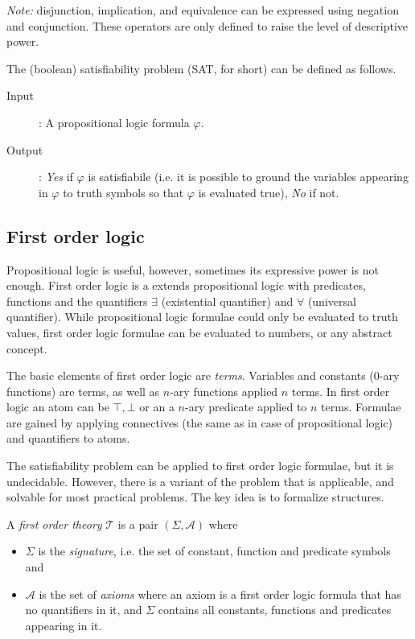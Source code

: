\emph{Note:} disjunction, implication, and equivalence can be expressed using negation and conjunction. These operators are only defined to raise the level of descriptive power.

The (boolean) satisfiability problem (SAT, for short) can be defined as follows.
\begin{description}
	\item[Input]: A propositional logic formula $\varphi$.
	\item[Output]: \emph{Yes} if $\varphi$ is satisfiabile (i.e. it is possible to ground the variables appearing in $\varphi$ to truth symbols so that $\varphi$ is evaluated true), \emph{No} if not.
\end{description}

\subsection{First order logic}

Propositional logic is useful, however, sometimes its expressive power is not enough. First order logic is a extends propositional logic with predicates, functions and the quantifiers $\exists$ (existential quantifier) and $\forall$ (universal quantifier). While propositional logic formulae could only be evaluated to truth values, first order logic formulae can be evaluated to numbers, or any abstract concept.

The basic elements of first order logic are \emph{terms}. Variables and constants (0-ary functions) are terms, as well as $n$-ary functions applied $n$ terms. In first order logic an atom can be $\top, \bot$ or an a $n$-ary predicate applied to $n$ terms. Formulae are gained by applying connectives (the same as in case of propositional logic) and quantifiers to atoms.

The satisfiability problem can be applied to first order logic formulae, but it is undecidable. However, there is a variant of the problem that is applicable, and solvable for most practical problems. The key idea is to formalize structures.

\begin{dfn}
	A \emph{first order theory} $\mathcal{T}$ is a pair $(\Sigma,\mathcal{A})$  where
	\begin{itemize}
		\item $\Sigma$ is the \emph{signature}, i.e. the set of constant, function and predicate symbols and
		\item $\mathcal{A}$ is the set of \emph{axioms} where an axiom is a first order logic formula that has no quantifiers in it, and $\Sigma$ contains all constants, functions and predicates appearing in it.
	\end{itemize}
\end{dfn}

